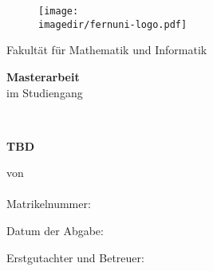 \begin{center}

    \begin{figure}[htbp]
        \centering
        \texttt{[image: \\imagedir/fernuni-logo.pdf]}
    \end{figure}

    \Large \uni

    \small Fakultät für Mathematik und Informatik %

    \vspace{0.5cm}

    \large \textbf{Masterarbeit} \\

    \large im Studiengang \autorStudiengang \\

    \vspace{1.0cm}

    \Large \textbf{\thema} \\

    \vspace{0.5cm}

    \normalsize \textbf{TBD} 

    \vspace{0.5cm}

    \large von \\ \autor\ \\ \small{Matrikelnummer: \autorMat}


    \vspace{1.0cm}

    \small Datum der Abgabe: \abgabedatum {}

    \vspace{0.5cm}

    \small Erstgutachter und Betreuer: \prueferA


\end{center}

\restoregeometry